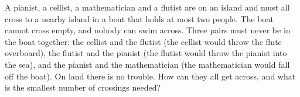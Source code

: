 A pianist, a cellist, a mathematician and a flutist are on an island and must all cross to a nearby island in a boat that holds at most two people. The boat cannot cross empty, and nobody can swim across. Three pairs must never be in the boat together: the cellist and the flutist (the cellist would throw the flute overboard), the flutist and the pianist (the flutist would throw the pianist into the sea), and the pianist and the mathematician (the mathematician would fall off the boat). On land there is no trouble. How can they all get across, and what is the smallest number of crossings needed?
